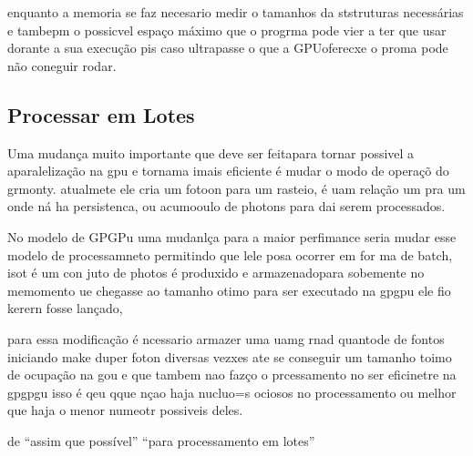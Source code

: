    enquanto a memoria se faz necesario medir o tamanhos da ststruturas necessárias e tambepm o possicvel espaço máximo que o progrma pode vier a ter que usar dorante a sua execução pis caso ultrapasse o que a GPUoferecxe o proma pode não coneguir rodar.



  \subsection{Processar em Lotes}
    Uma mudança muito importante que deve ser feitapara tornar possivel a aparalelização na gpu e tornama imais eficiente é  mudar o modo de operaçõ do grmonty. atualmete ele cria um fotoon para um rasteio, é uam relação um pra um onde ná ha persistenca, ou acumooulo de photons para dai serem processados.

    No modelo  de GPGPu uma mudanlça para a maior perfimance seria mudar esse modelo de processamneto permitindo que lele posa ocorrer em for ma de batch, isot é um con juto de photos é produxido e armazenadopara sobemente no memomento ue chegasse ao tamanho otimo para ser executado na gpgpu ele fio kerern fosse lançado,

    para essa modificação é ncessario armazer uma uamg rnad quantode de fontos iniciando  make duper foton diversas vezxes ate se conseguir um tamanho toimo de ocupação na gou e que tambem nao fazço o prcessamento no ser eficinetre na gpgpgu isso é qeu qque nçao haja nucluo=s ociosos no processamento ou melhor que haja o menor numeotr possiveis deles.

    de ``assim que possível'' ``para processamento em lotes''
